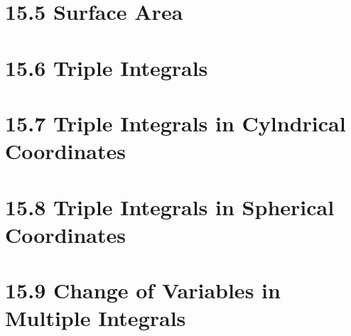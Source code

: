 \documentclass{article}
\begin{document}
\section*{15.5 Surface Area}
\section*{15.6 Triple Integrals}
\section*{15.7 Triple Integrals in Cylndrical Coordinates}
\section*{15.8 Triple Integrals in Spherical Coordinates}
\section*{15.9 Change of Variables in Multiple Integrals}
\end{document}
